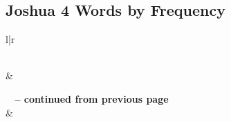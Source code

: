 

\subsection{Joshua 4 Words by Frequency}


\normalsize
 
\begin{center}
\begin{longtable}{l|r}
\caption[Joshua 4 Words by Frequency]{Joshua 4 Words by Frequency}\label{table:WordsbyFrequency for Joshua 4} \\
\hline {} &  \\ \hline 
\endfirsthead
 
{{\bfseries \tablename\ \thetable{} -- continued from previous page}} \\  
\hline {} &  \\ \hline 
\endhead
 

\end{longtable}
\end{center}
